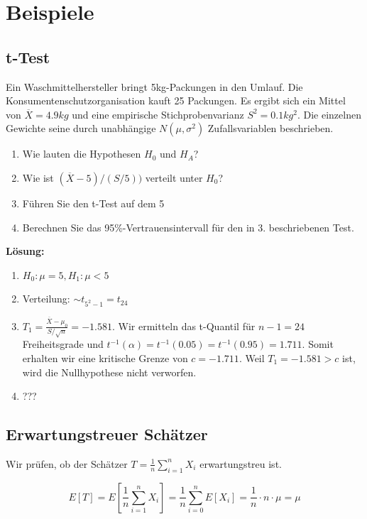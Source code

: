 \documentclass[10pt,a4paper,twocolumn]{article}
\begin{document}
\section{Beispiele}

\subsection{t-Test}
Ein Waschmittelhersteller bringt 5kg-Packungen in den Umlauf. Die Konsumentenschutzorganisation kauft 25 Packungen. Es ergibt sich ein Mittel von $\overline{X}=4.9kg$ und eine empirische Stichprobenvarianz $S^2 = 0.1kg^2$. Die einzelnen Gewichte seine durch unabhängige $N(\mu,\sigma^2)$ Zufallsvariablen beschrieben.

\begin{enumerate}
\item Wie lauten die Hypothesen $H_0$ und $H_A$?
\item Wie ist $(\overline{X}-5) / (S / 5))$ verteilt unter $H_0$?
\item Führen Sie den t-Test auf dem 5%
\item Berechnen Sie das 95\%-Vertrauensintervall für den in 3. beschriebenen Test.
\end{enumerate}

\vspace{10pt}

\textbf{Lösung:}
\begin{enumerate}
\item $H_0: \mu = 5, H_1: \mu < 5$
\item Verteilung: $\sim t_{5^2-1} = t_{24}$
\item $T_1 = \frac{\overline{X}-\mu_0}{S/\sqrt{n}} = -1.581$. Wir ermitteln das t-Quantil für $n-1 = 24$ Freiheitsgrade und $t^{-1}(\alpha) = t^{-1}(0.05) = t^{-1}(0.95) = 1.711$. Somit erhalten wir eine kritische Grenze von $c = -1.711$. Weil $T_1 = -1.581 > c$ ist, wird die Nullhypothese nicht verworfen.
\item ???
\end{enumerate}

\subsection{Erwartungstreuer Schätzer}
Wir prüfen, ob der Schätzer $T = \frac{1}{n}\sum\limits_{i=1}^{n}X_i$ erwartungstreu ist.

\[
E[T] = E\left[\frac{1}{n}\sum\limits_{i=1}^{n}X_i\right] = \frac{1}{n}\sum\limits_{i=0}^{n}E[X_i] = \frac{1}{n} \cdot n \cdot \mu = \mu
\]
\end{document}
